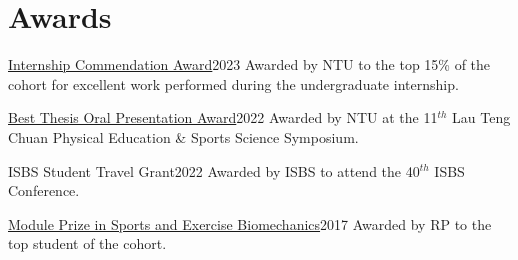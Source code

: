 \documentclass[../main.tex]{subfiles}
\begin{document}
\section{Awards}
  \vspace{2pt}
  \resumeSubHeadingListStart
    \layoutAwards
    {\href{https://drive.google.com/file/d/1-Zf9n5C39MHMhlUNPOGi2Gz_DRpPg0iC/view?usp=sharing}{Internship Commendation Award}}{2023}
    {Awarded by NTU to the top 15\% of the cohort for excellent work performed during the undergraduate internship.}
    
    \layoutAwards
    {\href{https://drive.google.com/file/d/1mcvcseOSgvzBLQg3tZVkGyIOOxVw6gKw/view?usp=sharing}{Best Thesis Oral Presentation Award}}{2022}
    {Awarded by NTU at the 11$^{th}$ Lau Teng Chuan Physical Education \& Sports Science Symposium.}

    \layoutAwards
    {ISBS Student Travel Grant}{2022}
    {Awarded by ISBS to attend the 40$^{th}$ ISBS Conference.}

    \layoutAwards
    {\href{https://drive.google.com/file/d/1XBcnEt7y5zhIwUpRF26wAV-EvdkGfJbf/view?usp=sharing}{Module Prize in Sports and Exercise Biomechanics}}{2017}
    {Awarded by RP to the top student of the cohort.}
  \resumeSubHeadingListEnd
\end{document}
